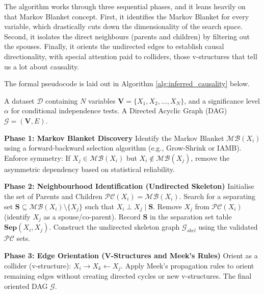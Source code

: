 \documentclass[11pt,a4paper]{article}
\begin{document}
The algorithm works through three sequential phases, and it leans 
heavily on that Markov Blanket concept. First, it identifies the Markov 
Blanket for every variable, which drastically cuts down the dimensionality 
of the search space. Second, it isolates the direct neighbours 
(parents and children) by filtering out the spouses. Finally, it orients 
the undirected edges to establish causal directionality, with special 
attention paid to colliders, those v-structures that tell us a lot about causality.

The formal pseudocode is laid out in Algorithm \ref{alg:inferred_causality} below.

\begin{algorithm}[H]
\caption{Inferred Causality Structure Learning}
\label{alg:inferred_causality}
\begin{algorithmic}[1]
\Require A dataset $\mathcal{D}$ containing $N$ variables $\mathbf{V} = \{X_1, X_2, \dots, X_N\}$, and a significance level $\alpha$ for conditional independence tests.
\Ensure A Directed Acyclic Graph (DAG) $\mathcal{G} = (\mathbf{V}, E)$.

\State \textbf{Phase 1: Markov Blanket Discovery}
    \State Identify the Markov Blanket $\mathcal{MB}(X_i)$ using a forward-backward selection algorithm (e.g., Grow-Shrink or IAMB).
    \State Enforce symmetry: If $X_j \in \mathcal{MB}(X_i)$ but $X_i \notin \mathcal{MB}(X_j)$, remove the asymmetric dependency based on statistical reliability.
\EndFor

\State \textbf{Phase 2: Neighbourhood Identification (Undirected Skeleton)}
    \State Initialise the set of Parents and Children $\mathcal{PC}(X_i) = \mathcal{MB}(X_i)$.
        \State Search for a separating set $\mathbf{S} \subseteq \mathcal{MB}(X_i) \setminus \{X_j\}$ such that $X_i \perp X_j \mid \mathbf{S}$.
            \State Remove $X_j$ from $\mathcal{PC}(X_i)$ (identify $X_j$ as a spouse/co-parent).
            \State Record $\mathbf{S}$ in the separation set table $\mathbf{Sep}(X_i, X_j)$.
        \EndIf
    \EndFor
\EndFor
\State Construct the undirected skeleton graph $\mathcal{G}_{skel}$ using the validated $\mathcal{PC}$ sets.

\State \textbf{Phase 3: Edge Orientation (V-Structures and Meek's Rules)}
        \State Orient as a collider (v-structure): $X_i \rightarrow X_k \leftarrow X_j$.
    \EndIf
\EndFor
\State Apply Meek's propagation rules to orient remaining edges without creating directed cycles or new v-structures.
\State \Return The final oriented DAG $\mathcal{G}$.
\end{algorithmic}
\end{algorithm}





\end{document}
